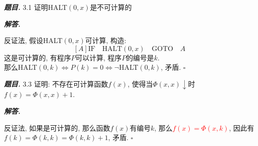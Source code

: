 \documentclass[10pt, a4paper, oneside]{ctexart}
\newenvironment{problem}{\begin{framed}\par\noindent\textbf{\textit{题目. }}}{\end{framed}\par}
\newenvironment{solution}{%
  \par\noindent\textbf{\textit{解答. }}\ignorespaces
}{%
  \hfill\ensuremath{\square}\par
}
\begin{document}
\begin{problem}
    3.1 证明HALT$(0,x)$是不可计算的
\end{problem}
\begin{solution}
反证法, 假设HALT$(0,x)$可计算, 构造:
$$[A] \text{IF} \quad  \text{HALT}(0,x) \quad \text{GOTO} \quad A $$
这是可计算的, 有程序$P$可以计算, 程序$P$的编号是$k$.\\
那么HALT$(0,k) \iff P(k)=0 \iff \neg $HALT$(0,k)$, 矛盾.
\end{solution}

\begin{problem}
    3.3 证明: 不存在可计算函数$f(x)$, 使得当$\Phi(x,x)\downarrow$时$f(x) = \Phi(x,x)+1$.
\end{problem}
\begin{solution}
    反证法, 如果是可计算的, 那么函数$f(x)$有编号$k$, 那么\textcolor{red}{$f(x)=\Phi(x,k)$}, 因此有$f(k)=\Phi(k,k)=\Phi(k,k)+1$, 矛盾.
\end{solution}
\end{document}
